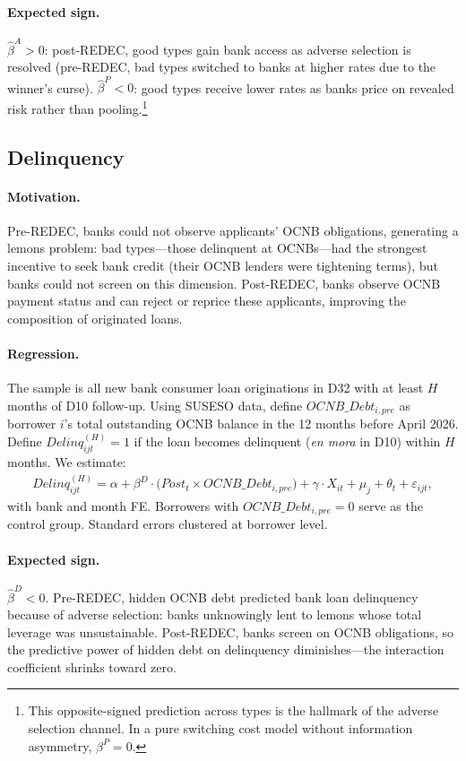 \documentclass[12pt]{article}
\theoremstyle{plain}
\theoremstyle{plain}
\begin{document}
\paragraph{Expected sign.} $\hat{\beta}^{A} > 0$: post-REDEC, good types gain bank access as adverse selection is resolved (pre-REDEC, bad types switched to banks at higher rates due to the winner's curse). $\hat{\beta}^{P} < 0$: good types receive lower rates as banks price on revealed risk rather than pooling.\footnote{This opposite-signed prediction across types is the hallmark of the adverse selection channel. In a pure switching cost model without information asymmetry, $\beta^{P} = 0$.}

\subsection{Delinquency}

\paragraph{Motivation.} Pre-REDEC, banks could not observe applicants' OCNB obligations, generating a lemons problem: bad types---those delinquent at OCNBs---had the strongest incentive to seek bank credit (their OCNB lenders were tightening terms), but banks could not screen on this dimension. Post-REDEC, banks observe OCNB payment status and can reject or reprice these applicants, improving the composition of originated loans.

\paragraph{Regression.} The sample is all new bank consumer loan originations in D32 with at least $H$ months of D10 follow-up. Using SUSESO data, define $OCNB\_Debt_{i,pre}$ as borrower $i$'s total outstanding OCNB balance in the 12 months before April 2026. Define $Delinq_{ijt}^{(H)} = 1$ if the loan becomes delinquent (\textit{en mora} in D10) within $H$ months. We estimate:
\begin{align}
    Delinq_{ijt}^{(H)} = \alpha + \beta^{D} \cdot \bigl(Post_t \times OCNB\_Debt_{i,pre}\bigr) + \gamma \cdot X_{it} + \mu_j + \theta_t + \varepsilon_{ijt},
\label{eq:delinquency}
\end{align}
with bank and month FE. Borrowers with $OCNB\_Debt_{i,pre} = 0$ serve as the control group. Standard errors clustered at borrower level.

\paragraph{Expected sign.} $\hat{\beta}^{D} < 0$. Pre-REDEC, hidden OCNB debt predicted bank loan delinquency because of adverse selection: banks unknowingly lent to lemons whose total leverage was unsustainable. Post-REDEC, banks screen on OCNB obligations, so the predictive power of hidden debt on delinquency diminishes---the interaction coefficient shrinks toward zero.
\end{document}

